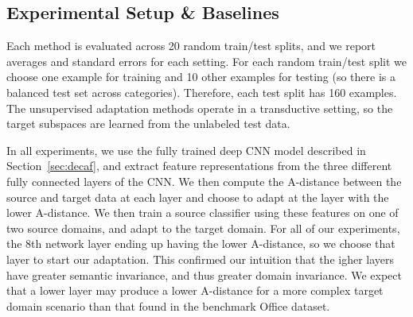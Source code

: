 \subsection{Experimental Setup \& Baselines}
 
 Each method is evaluated across 20 random train/test splits, and we report averages and standard errors for each setting. 
For each random train/test split we choose one example for training and 10 other examples for testing (so there is a balanced test set across categories). Therefore, each test split has 160 examples. The unsupervised adaptation methods operate in a transductive setting, so the target subspaces are learned from the unlabeled test data.

In all experiments, we use the fully trained deep CNN model described in Section~\ref{sec:decaf}, and extract feature representations from the three different fully connected layers of the CNN. We then compute the A-distance between the source and target data at each layer and choose to adapt at the layer with the lower A-distance. We then train a source classifier using these features on one of two source domains, and adapt to the target domain. For all of our experiments, the 8th network layer ending up having the lower A-distance, so we choose that layer to start our adaptation.
This confirmed our intuition that the igher layers have greater semantic invariance, and thus greater domain invariance.
We expect that a lower layer may produce a lower A-distance for a more complex target domain scenario than that found in the benchmark Office dataset.







